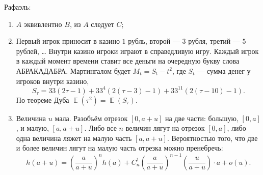\documentclass[12pt]{article}
\DeclareMathOperator{\E}{\mathbb{E}}
\begin{document}
Рафаэль:

\begin{enumerate}
    \item $A$ эквивлентно $B$, из $A$ следует $C$;
    \item Первый игрок приносит в казино $1$ рубль, второй — $3$ рубля, третий — $5$ рублей, \dots
    Внутри казино игроки играют в справедливую игру. 
    Каждый игрок в каждый момент времени ставит все деньги на очередную букву слова АБРАКАДАБРА.
    Мартингалом будет $M_t = S_t - t^2$, где $S_t$ — сумма денег у игроков внутри казино,
    \[
    S_{\tau} = 33(2\tau - 1) + 33^4(2(\tau - 3) - 1) + 33^{11}(2(\tau - 10) - 1).
    \]
    По теореме Дуба $\E(\tau^2) = \E(S_\tau)$.
    \item Величина $u$ мала. Разобъём отрезок $[0, a + u]$ на две части: большую, $[0, a]$, и малую, $[a, a + u]$.
    Либо все $n$ величин лягут на отрезок $[0, a]$, либо одна величина ляжет на малую часть $[a, a + u]$.
    Вероятностью того, что две и более величин лягут на малую часть отрезка можно пренебречь:
    \[
    h(a + u) = \left(\frac{a}{a + u}\right)^n h(a) + C_n^1 \left(\frac{a}{a + u}\right)^{n-1} \left(\frac{u}{a + u}\right) \cdot a + o(u).
    \]
\end{enumerate}
\end{document}
